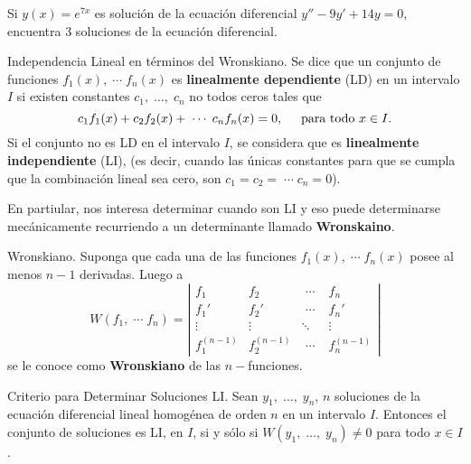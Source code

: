 \documentclass{beamer}
\begin{document}
\begin{frame}[t]
	\begin{example}
		Si \(y(x) = e^{7x}\) es solución de la ecuación diferencial \(y'' -9y' +14y=0\), encuentra 3 soluciones de la ecuación diferencial.
	\end{example}
\end{frame}

\begin{frame}[t]
	\begin{block}{Independencia Lineal en términos del Wronskiano.}
		Se dice que un conjunto de funciones \(f_1(x) , \;\cdots\; f_n(x)\) es \textbf{linealmente dependiente} (LD) en un intervalo \(I\) si existen constantes \(c_1, \;\ldots,\; c_n\) no todos ceros tales que
		\[
			c_1f_1(x) + c_2f_2(x) + \;\cdots\; c_nf_n(x) =0, \hspace{5mm} \mbox{para todo } x \in I.
		\]
		Si el conjunto no es LD en el intervalo \(I\), se considera que es \textbf{linealmente independiente} (LI), (es decir, cuando las únicas constantes para que se cumpla que la combinación lineal sea cero, son \(c_1=c_2= \;\cdots\; c_n=0\)).
	\end{block} 
	En partiular, nos interesa determinar cuando son LI y eso puede determinarse mecánicamente recurriendo a un determinante llamado \textbf{Wronskaino}.
\end{frame}

\begin{frame}[t]
	\begin{block}{Wronskiano.}
		Suponga que cada una de las funciones \(f_1(x) , \;\cdots\; f_n(x)\) posee al menos \(n-1\) derivadas. Luego a
		\[
			W(f_1, \;\cdots\; f_n) = \left| \begin{array}{llll}
				f_1 				& f_2 				& \;\cdots\;  				& f_n\\[2mm]
				f_1' 				& f_2' 				& \;\cdots\;  				& f_n'\\[2mm]
				\vdots & \vdots & \ddots & \vdots \\[2mm]
				f^{(n-1)}_1 				& f^{(n-1)}_2 				& \;\cdots\;  				& f^{(n-1)}_n
			\end{array}\right| 
		\]
		se le conoce como \textbf{Wronskiano} de las \(n-\)funciones.
	\end{block} 
	\begin{block}{Criterio para Determinar Soluciones LI.}
		Sean \(y_1, \;\ldots,\; y_n\), \(n\) soluciones de la ecuación diferencial lineal homogénea de orden \(n\) en un intervalo \(I\). Entonces el conjunto de soluciones es LI, en \(I\), si y sólo si \(W(y_1, \;\ldots,\; y_n) \ne 0\) para todo \(x \in I\).
	\end{block}
\end{frame}
\end{document}
